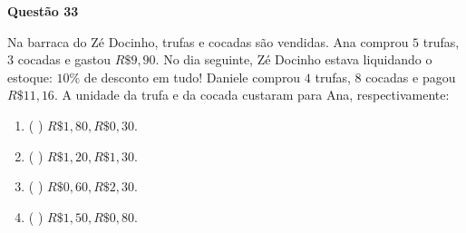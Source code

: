 {\bf Questão 33} 

 Na barraca do Zé Docinho, trufas e cocadas são vendidas. Ana comprou $5$ trufas, $3$ cocadas e gastou $R\$ 9,90$.
No dia seguinte, Zé Docinho estava liquidando o estoque: $10\%$ de desconto em tudo! Daniele comprou $4$ trufas,
$8$ cocadas e pagou $R\$ 11,16$. A unidade da trufa e da cocada custaram para Ana, respectivamente:
\begin{multicols}{2}
\begin{enumerate}
		\item ( ) $R\$ 1,80, R\$ 0,30$.
		\item ( ) $R\$ 1,20, R\$ 1,30$.
		\item ( ) $R\$ 0,60, R\$ 2,30$.
		\item ( ) $R\$ 1,50, R\$ 0,80$.
		\end{enumerate}
\end{multicols}
